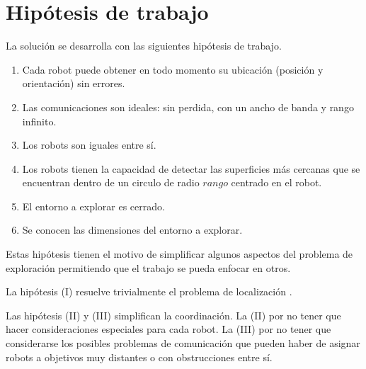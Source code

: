 

\section{Hipótesis de trabajo}\label{sec:hip}
La solución se desarrolla con las siguientes hipótesis de trabajo.
\begin{enumerate}[label=(\roman*)]
  \item Cada robot puede obtener en todo momento su ubicación (posición y
    orientación) sin errores.
  \item Las comunicaciones son ideales: sin perdida, con un ancho de banda y rango infinito.
  \item Los robots son iguales entre sí.
  \item Los robots tienen la capacidad de detectar las superficies más cercanas
    que se encuentran dentro de un circulo de radio $rango$ centrado en el
    robot.
  \item El entorno a explorar es cerrado.
  \item Se conocen las dimensiones del entorno a explorar.
\end{enumerate}

Estas hipótesis tienen el motivo de simplificar algunos aspectos del
problema de exploración permitiendo que el trabajo se pueda enfocar en otros.

La hipótesis (I) resuelve trivialmente el problema de localización \cite{slam}. 

Las hipótesis (II) y (III) simplifican la coordinación. La (II) por no tener
que hacer consideraciones especiales para cada robot. La (III) por no tener que
considerarse los posibles problemas de comunicación que pueden haber de asignar
robots a objetivos muy distantes o con obstrucciones entre sí. 

